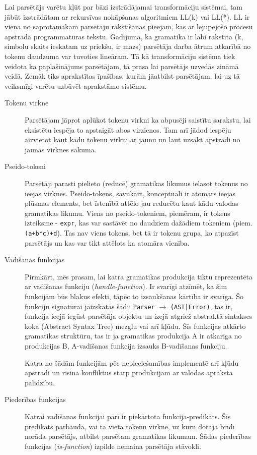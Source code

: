 \documentclass[12pt]{report}
\begin{document}
Lai parsētājs varētu kļūt par bāzi izstrādājamai transformāciju sistēmai, tam jābūt izstrādātam ar rekursīvas nokāpšanas algoritmiem LL(k) vai LL(*). LL ir viena no saprotamākām parsētāju rakstīšanas pieejam, kas ar lejupejošo procesu apstrādā programmatūras tekstu. Gadījumā, ka gramatika ir labi rakstīta (k, simbolu skaits ieskatam uz priekšu, ir mazs) parsētāja darba ātrum atkarībā no tokenu daudzuma var tuvoties lineāram. \cite{Lewis:LLParsers}
Tā kā transformāciju sistēma tiek veidota ka paplašinājums parsētājam, tā prasa lai parsētājs uzvedās zināmā veidā. Zemāk tiks aprakstītas īpašības, kurām jāatbilst parsētājam, lai uz tā veiksmīgi varētu uzbūvēt aprakstāmo sistēmu.
\begin{description}
\item[Tokenu virkne]
Parsētājam jāprot aplūkot tokenu virkni ka abpusēji saistītu sarakstu, lai eksistētu iespēja to apstaigāt abos virzienos. Tam arī jādod iespēju aizvietot kaut kādu tokenu virkni ar jaunu un ļaut uzsākt apstrādi no jaunās virknes sākuma.
\item[Pseido-tokeni]
Parsētāji parasti pielieto (reducē) gramatikas likumus ielasot tokenus no ieejas virknes. Pseido-tokens, savukārt, konceptuāli ir atomārs ieejas plūsmas elements, bet īstenībā attēlo jau reducētu kaut kādu valodas gramatikas likumu. Viens no pseido-tokeniem, piemēram, ir tokens izteiksme - \verb|expr|, kas var sastāvēt no daudziem dažādiem tokeniem (piem. \verb|(a+b*c)+d|). Tas nav viens tokens, bet tā ir tokenu grupa, ko atpazīst parsētājs un kas var tikt attēlots ka atomāra vienība.
\item[Vadīšanas funkcijas]
Pirmkārt, mēs prasam, lai katra gramatikas produkcija tiktu reprezentēta ar vadīšanas funkciju (\emph{handle-function}). Ir svarīgi atzīmēt, ka šim funkcijām būs blakus efekti, tāpēc to izsaukšanas kārtība ir svarīga. Šo funkciju signatūrai jāizskatās šādi: \verb|Parser| $\to$ \verb/(AST|Error)/, tas ir, funkcija ieejā iegūst parsētāja objektu un izejā atgriež abstraktā sintakses koka (Abstract Syntax Tree) mezglu vai arī kļūdu. Šīs funkcijas atkārto gramatikas struktūru, tas ir ja gramatikas produkcija A ir atkarīga no produkcijas B, A-vadīšanas funkcija izsauks B-vadīšanas funkciju. 

Katra no šādām funkcijām pēc nepieciešamības implementē arī kļūdu apstrādi un risina konfliktus starp produkcijām ar valodas apraksta palīdzību.
\item[Piederības funkcijas]
Katrai vadīšanas funkcijai pārī ir piekārtota funkcija-predikāts. Šīs predikāts pārbauda, vai tā vietā tokenu virknē, uz kuru dotajā brīdī norāda parsētājs, atbilst parsētam gramatikas likumam. Šādas piederības funkcijas (\emph{is-function}) izpilde nemaina parsētāja stāvokli. 


\end{description}
\end{document}
